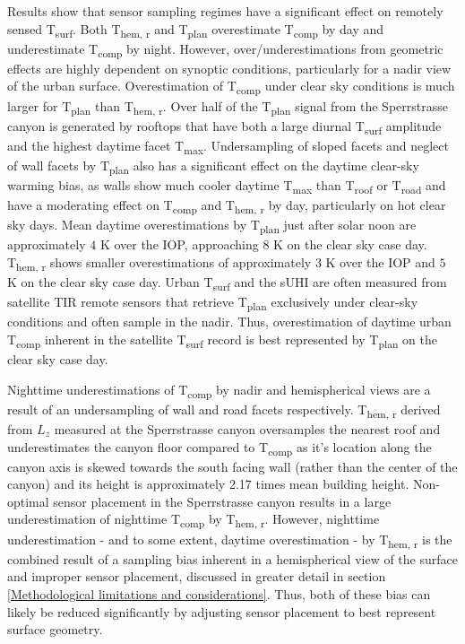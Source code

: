 \begin{bibunit}
Results show that sensor sampling regimes have a significant effect on remotely sensed T\textsubscript{surf}. Both T\textsubscript{hem, r} and T\textsubscript{plan} overestimate T\textsubscript{comp} by day and underestimate T\textsubscript{comp} by night. However, over/underestimations from geometric effects are highly dependent on synoptic conditions, particularly for a nadir view of the urban surface. Overestimation of T\textsubscript{comp} under clear sky conditions is much larger for T\textsubscript{plan} than T\textsubscript{hem, r}. Over half of the T\textsubscript{plan} signal from the Sperrstrasse canyon is generated by rooftops that have both a large diurnal T\textsubscript{surf} amplitude and the highest daytime facet T\textsubscript{max}. Undersampling of sloped facets and neglect of wall facets by T\textsubscript{plan} also has a significant effect on the daytime clear-sky warming bias, as walls show much cooler daytime T\textsubscript{max} than T\textsubscript{roof} or T\textsubscript{road} and have a moderating effect on T\textsubscript{comp} and T\textsubscript{hem, r} by day, particularly on hot clear sky days. Mean daytime overestimations by T\textsubscript{plan} just after solar noon are approximately $4$ \si{K} over the IOP, approaching $8$ \si{K} on the clear sky case day. T\textsubscript{hem, r} shows smaller overestimations of approximately $3$ \si{K} over the IOP and $5$ \si{K} on the clear sky case day. Urban T\textsubscript{surf} and the sUHI are often measured from satellite TIR remote sensors that retrieve T\textsubscript{plan} exclusively under clear-sky conditions and often sample in the nadir. Thus, overestimation of daytime urban T\textsubscript{comp} inherent in the satellite T\textsubscript{surf} record is best represented by T\textsubscript{plan} on the clear sky case day. 

Nighttime underestimations of T\textsubscript{comp} by nadir and hemispherical views are a result of an undersampling of wall and road facets respectively. T\textsubscript{hem, r} derived from $L_z$ measured at the Sperrstrasse canyon oversamples the nearest roof and underestimates the canyon floor compared to T\textsubscript{comp} as it's location along the canyon axis is skewed towards the south facing wall (rather than the center of the canyon) and its height is approximately 2.17 times mean building height. Non-optimal sensor placement in the Sperrstrasse canyon results in a large underestimation of nighttime T\textsubscript{comp} by T\textsubscript{hem, r}. However, nighttime underestimation - and to some extent, daytime overestimation - by T\textsubscript{hem, r} is the combined result of a sampling bias inherent in a hemispherical view of the surface and improper sensor placement, discussed in greater detail in section \ref{Methodological limitations and considerations}. Thus, both of these bias can likely be reduced significantly by adjusting sensor placement to best represent surface geometry. 


\end{bibunit}
